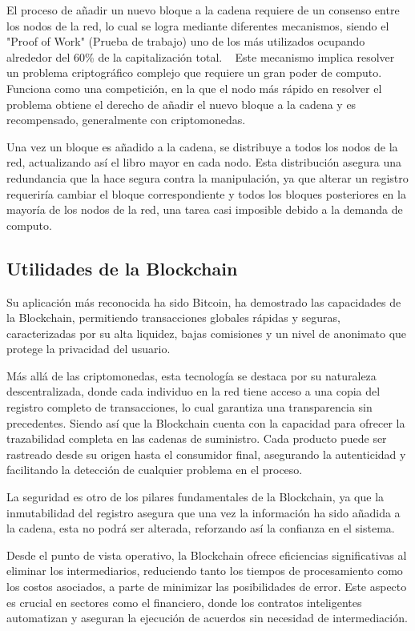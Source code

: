 El proceso de añadir un nuevo bloque a la cadena requiere de un consenso entre los nodos de la red, lo cual se logra mediante diferentes mecanismos, siendo el "Proof of Work" (Prueba de trabajo) uno de los más utilizados ocupando alrededor del 60\% de la capitalización total. ~\cite{proofOfWork}
Este mecanismo implica resolver un problema criptográfico complejo que requiere un gran poder de computo. Funciona como una competición, en la que el nodo más rápido en resolver el problema obtiene el derecho de añadir el nuevo bloque a la cadena y es recompensado, generalmente con criptomonedas.

Una vez un bloque es añadido a la cadena, se distribuye a todos los nodos de la red, actualizando así el libro mayor en cada nodo. Esta distribución asegura una redundancia que la hace segura contra la manipulación, ya que alterar un registro requeriría cambiar el bloque correspondiente y todos los bloques posteriores en la mayoría de los nodos de la red, una tarea casi imposible debido a la demanda de computo.


\subsection{Utilidades de la Blockchain}

Su aplicación más reconocida ha sido Bitcoin, ha demostrado las capacidades de la Blockchain, permitiendo transacciones globales rápidas y seguras, caracterizadas por su alta liquidez, bajas comisiones y un nivel de anonimato que protege la privacidad del usuario. ~\cite{introducciónBitcoin}

Más allá de las criptomonedas, esta tecnología se destaca por su naturaleza descentralizada, donde cada individuo en la red tiene acceso a una copia del registro completo de transacciones, lo cual garantiza una transparencia sin precedentes. Siendo así que la Blockchain cuenta con la capacidad para ofrecer la trazabilidad completa en las cadenas de suministro. Cada producto puede ser rastreado desde su origen hasta el consumidor final, asegurando la autenticidad y facilitando la detección de cualquier problema en el proceso.~\cite{introducciónBlockchain}

La seguridad es otro de los pilares fundamentales de la Blockchain, ya que la inmutabilidad del registro asegura que una vez la información ha sido añadida a la cadena, esta no podrá ser alterada, reforzando así la confianza en el sistema. 

Desde el punto de vista operativo, la Blockchain ofrece eficiencias significativas al eliminar los intermediarios, reduciendo tanto los tiempos de procesamiento como los costos asociados, a parte de minimizar las posibilidades de error.
Este aspecto es crucial en sectores como el financiero, donde los contratos inteligentes automatizan y aseguran la ejecución de acuerdos sin necesidad de intermediación.


